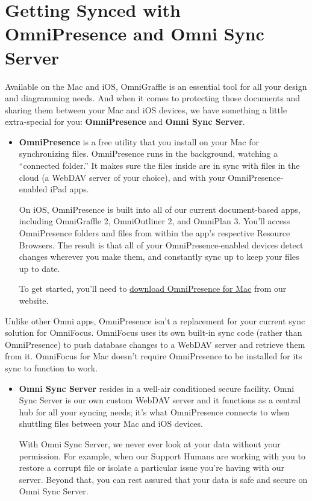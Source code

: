 \documentclass[../main.tex]{subfiles}
\begin{document}
\chapter{Getting Synced with OmniPresence and Omni Sync Server}

Available on the Mac and iOS, OmniGraffle is an essential tool for all your design and
diagramming needs. And when it comes to protecting those documents and sharing them between
your Mac and iOS devices, we have something a little extra-special for you:
\textbf{OmniPresence} and \textbf{Omni Sync Server}.

\begin{itemize}
  \item \textbf{OmniPresence} is a free utility that you install on your Mac for synchronizing
    files. OmniPresence runs in the background, watching a ``connected folder.'' It makes sure
    the files inside are in sync with files in the cloud (a WebDAV server of your choice), and
    with your OmniPresence-enabled iPad apps.

    On iOS, OmniPresence is built into all of our current document-based apps, including
    OmniGraffle 2, OmniOutliner 2, and OmniPlan 3. You'll access OmniPresence folders and files
    from within the app's respective Resource Browsers. The result is that all of your
    OmniPresence-enabled devices detect changes wherever you make them, and constantly sync up
    to keep your files up to date.

    To get started, you'll need to
    \href{http://www.omnigroup.com/download/latest/omnipresence}{download OmniPresence for Mac}
    from our website.
\end{itemize}

\begin{ognote}
  Unlike other Omni apps, OmniPresence isn't a replacement for your current sync solution for
  OmniFocus. OmniFocus uses its own built-in sync code (rather than OmniPresence) to push
  database changes to a WebDAV server and retrieve them from it. OmniFocus for Mac doesn't
  require OmniPresence to be installed for its sync to function to work.
\end{ognote}

\begin{itemize}
  \item \textbf{Omni Sync Server} resides in a well-air conditioned secure facility. Omni Sync
    Server is our own custom WebDAV server and it functions as a central hub for all your
    syncing needs; it's what OmniPresence connects to when shuttling files between your Mac and
    iOS devices.

    With Omni Sync Server, we never ever look at your data without your permission. For example,
    when our Support Humans are working with you to restore a corrupt file or isolate a
    particular issue you're having with our server. Beyond that, you can rest assured that your
    data is safe and secure on Omni Sync Server.
\end{itemize}
\end{document}
